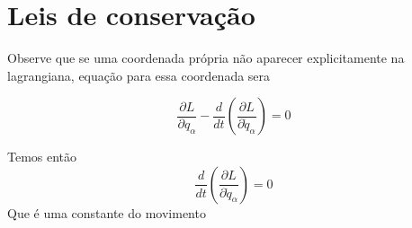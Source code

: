 \documentclass[11pt]{article}
\begin{document}
\section{Leis de conservação}
\label{sec:org4ad5f86}
Observe que se uma coordenada própria não aparecer explicitamente na
lagrangiana, equação para essa coordenada sera

  \begin{equation}
\frac{\partial L}{\partial q_{\alpha}} - \frac{d}{dt}\left(\frac{\partial L}{\partial \dot{q}_{\alpha}} \right) = 0
  \end{equation}

Temos então
 \begin{equation}
\frac{d}{dt}\left(\frac{\partial L}{\partial \dot{q}_{\alpha}}\right) = 0
 \end{equation}
Que é uma constante do movimento
\end{document}
